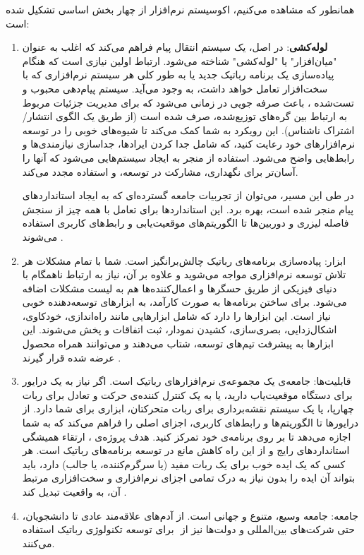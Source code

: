 همانطور که مشاهده ‌می‌کنیم، اکوسیستم نرم‌افزار  از چهار بخش اساسی تشکیل شده است:
\begin{enumerate}
    \item \textbf{لوله‌کشی}: در اصل،  یک سیستم انتقال پیام فراهم می‌کند که اغلب به عنوان "میان‌افزار" یا "لوله‌کشی" شناخته می‌شود. ارتباط اولین نیازی است که هنگام پیاده‌سازی یک برنامه رباتیک جدید یا به طور کلی هر سیستم نرم‌افزاری که با سخت‌افزار تعامل خواهد داشت، به وجود می‌آید. سیستم پیام‌دهی محبوب و تست‌شده‌ ، باعث صرفه جویی در زمانی می‌شود که برای مدیریت جزئیات مربوط به ارتباط بین گره‌های توزیع‌شده،‌ صرف شده است (از طریق یک الگوی انتشار/اشتراک ناشناس). این رویکرد به شما کمک می‌کند تا شیوه‌های خوبی را در توسعه نرم‌افزار‌های خود رعایت کنید، که شامل جدا کردن ایرادها، جداسازی نیازمندی‌ها و رابط‌هایی واضح می‌شود. استفاده از  منجر به ایجاد سیستم‌هایی می‌شود که آنها را آسان‌تر برای نگهداری، مشارکت در توسعه، و استفاده مجدد می‌کند.
    
    در طی این مسیر، می‌توان از تجربیات جامعه گسترده‌ای که به ایجاد استانداردهای پیام  منجر شده است، بهره برد. این استانداردها برای تعامل با همه چیز از سنجش فاصله لیزری و دوربین‌ها تا الگوریتم‌های موقعیت‌یابی و رابط‌های کاربری استفاده می‌شوند \cite{ROS:2023}.
    \item ابزار: پیاده‌سازی برنامه‌های رباتیک چالش‌برانگیز است. شما با تمام مشکلات هر تلاش توسعه نرم‌افزاری مواجه می‌شوید و علاوه بر آن، نیاز به ارتباط ناهمگام با دنیای فیزیکی از طریق حسگرها و اعمال‌کننده‌ها هم به لیست مشکلات اضافه می‌شود. برای ساختن برنامه‌ها به صورت کارآمد، به ابزارهای توسعه‌دهنده خوبی نیاز است.  این ابزارها را دارد که شامل ابزارهایی مانند راه‌اندازی، خودکاوی، اشکال‌زدایی، بصری‌سازی، کشیدن نمودار، ثبت اتفاقات و پخش می‌شوند. این ابزارها به پیشرفت تیم‌های توسعه، شتاب می‌دهند و می‌توانند همراه محصول عرضه ‌شده قرار گیرند \cite{ROS:2023}.

    \item قابلیت‌ها: جامعه‌ی  یک مجموعه‌ی نرم‌افزارهای رباتیک است. اگر نیاز به یک درایور برای دستگاه موقعیت‌یاب دارید، یا به یک کنترل کننده‌ی حرکت و تعادل برای ربات چهارپا، یا یک سیستم نقشه‌برداری برای ربات متحرکتان،  ابزاری برای شما دارد. از درایورها تا الگوریتم‌ها و رابط‌های کاربری،  اجزای اصلی را فراهم می‌کند که به شما اجازه می‌دهد تا بر روی برنامه‌ی خود تمرکز کنید. هدف پروژه‌ی ، ارتقاء همیشگی استانداردهای رایج و از این راه کاهش مانع در توسعه برنامه‌های رباتیک است. هر کسی که یک ایده خوب برای یک ربات مفید (یا سرگرم‌کننده، یا جالب) دارد، باید بتواند آن ایده را بدون نیاز به درک تمامی اجزای نرم‌افزاری و سخت‌افزاری مرتبط آن، به واقعیت تبدیل کند \cite{ROS:2023}.

    \item جامعه: جامعه  وسیع، متنوع و جهانی است. از آدم‌های علاقه‌مند عادی تا دانشجویان، حتی شرکت‌های بین‌المللی و دولت‌ها نیز از ‌ برای توسعه تکنولوژی رباتیک استفاده می‌کنند.
\end{enumerate}


